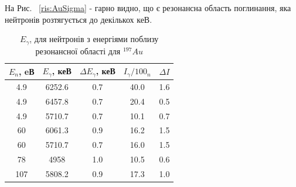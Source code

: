 \documentclass[a4paper, 14pt]{article}
\numberwithin{equation}{section}
\numberwithin{table}{section}
\begin{document}
На Рис. ~\ref{ris:AuSigma} - гарно видно, що є резонансна область поглинання, яка нейтронів розтягується до декількох кеВ. 
\begin{table}[h]
	\centering
	\caption{$E_\gamma$, для нейтронів з енергіями поблизу резонансної області для $^{197}Au$} 
	\begin{tabular}{|c|c|c|c|c|} 
		\hline
		$E_{n}$, eВ&$E_{\gamma}$, кеВ & $\Delta{E_{\gamma}}$, кеВ & $I_{\gamma} / 100_n$ & $\Delta{I}$ \\
		\hline
		4.9 & 6252.6 & 0.7 & 40.0 & 1.6 \\
		\hline
		4.9 & 6457.8 & 0.7 & 20.4 & 0.5\\	
		\hline
		4.9 & 5710.7 & 0.7 & 10.1 & 0.7 \\	
		\hline	%
		60 & 6061.3 & 0.9 & 16.2 & 1.5 \\	
		\hline %
		60 & 5710.7 & 0.7 & 16.0 & 1.5 \\	
		\hline %
		78 & 4958 & 1.0 & 10.5 & 0.6\\	
		\hline%
		107 & 5808.2 & 0.9 & 17.3 & 1.0 \\	
		\hline
	\end{tabular}
	\label{tabl:AuNeutronAbsorption}
\end{table}
\end{document}
